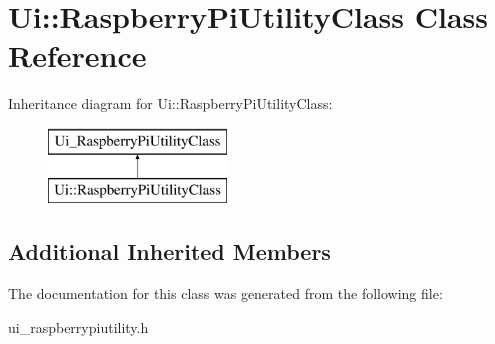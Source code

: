 \hypertarget{classUi_1_1RaspberryPiUtilityClass}{}\section{Ui\+:\+:Raspberry\+Pi\+Utility\+Class Class Reference}
\label{classUi_1_1RaspberryPiUtilityClass}
Inheritance diagram for Ui\+:\+:Raspberry\+Pi\+Utility\+Class\+:\begin{figure}[H]
\begin{center}
\leavevmode
\includegraphics[height=2.000000cm]{classUi_1_1RaspberryPiUtilityClass}
\end{center}
\end{figure}
\subsection*{Additional Inherited Members}


The documentation for this class was generated from the following file\+:\begin{DoxyCompactItemize}
\item 
ui\+\_\+raspberrypiutility.\+h\end{DoxyCompactItemize}
